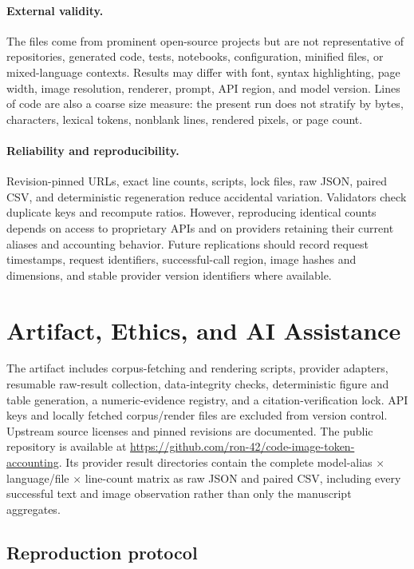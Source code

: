 \documentclass[sigconf,nonacm]{acmart}
\begin{document}
\paragraph{External validity.}
The files come from prominent open-source projects but are not representative
of repositories, generated code, tests, notebooks, configuration, minified
files, or mixed-language contexts. Results may differ with font, syntax
highlighting, page width, image resolution, renderer, prompt, API region, and
model version. Lines of code are also a coarse size measure: the present run
does not stratify by bytes, characters, lexical tokens, nonblank lines, rendered
pixels, or page count.

\paragraph{Reliability and reproducibility.}
Revision-pinned URLs, exact line counts, scripts, lock files, raw JSON, paired
CSV, and deterministic regeneration reduce accidental variation. Validators
check duplicate keys and recompute ratios. However, reproducing identical
counts depends on access to proprietary APIs and on providers retaining their
current aliases and accounting behavior. Future replications should record
request timestamps, request identifiers, successful-call region, image hashes
and dimensions, and stable provider version identifiers where available.

\section{Artifact, Ethics, and AI Assistance}

The artifact includes corpus-fetching and rendering scripts, provider adapters,
resumable raw-result collection, data-integrity checks, deterministic figure and
table generation, a numeric-evidence registry, and a citation-verification lock.
API keys and locally fetched corpus/render files are excluded from version
control. Upstream source licenses and pinned revisions are documented. The
public repository is available at
\url{https://github.com/ron-42/code-image-token-accounting}. Its provider result
directories contain the complete model-alias $\times$ language/file $\times$
line-count matrix as raw JSON and paired CSV, including every successful text
and image observation rather than only the manuscript aggregates.

\subsection{Reproduction protocol}
\end{document}
